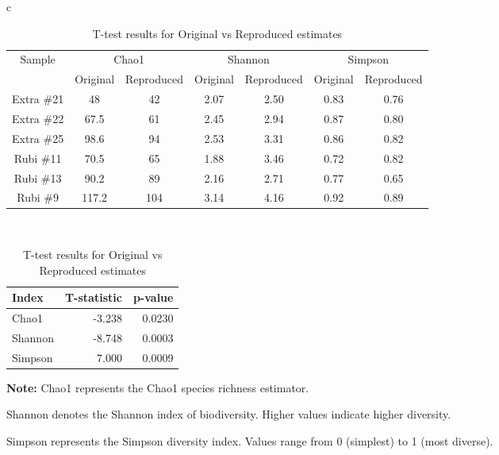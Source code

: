    
\begin{table}[H]
\centering
\begin{threeparttable}
\caption{Comparison of Original and reproduced estimates and T-test results}
\begin{tabular}{c}
\begin{subtable}{\textwidth}
\centering
\caption{Species richness and diversity of fungal communities in Extra and Rubi beer barrels}
\begin{tabular}{|c|c|c|c|c|c|c|}
\hline
\multirow{2}{*}{Sample} & \multicolumn{2}{c|}{Chao1} & \multicolumn{2}{c|}{Shannon} & \multicolumn{2}{c|}{Simpson} \\ \cline{2-7} 
                        & Original & Reproduced & Original & Reproduced & Original & Reproduced \\ \hline
Extra \#21              & 48    & 42  & 2.07    & 2.50    & 0.83    & 0.76    \\ \hline
Extra \#22              & 67.5  & 61  & 2.45    & 2.94    & 0.87    & 0.80    \\ \hline
Extra \#25              & 98.6  & 94  & 2.53    & 3.31    & 0.86    & 0.82    \\ \hline
Rubi \#11               & 70.5  & 65  & 1.88    & 3.46    & 0.72    & 0.82    \\ \hline
Rubi \#13               & 90.2  & 89  & 2.16    & 2.71    & 0.77    & 0.65    \\ \hline
Rubi \#9                & 117.2 & 104 & 3.14    & 4.16    & 0.92    & 0.89    \\ \hline
\end{tabular}
\end{subtable}
\\
\begin{subtable}{\textwidth}
\centering
\caption{T-test results for Original vs Reproduced estimates}
\begin{tabular}{|l|r|r|}
\hline
  Index &  T-statistic &  p-value \\
\hline
  Chao1 &    -3.238 & 0.0230 \\
\hline
Shannon &    -8.748 & 0.0003 \\
\hline
Simpson &     7.000 & 0.0009 \\
\hline
\end{tabular}
\end{subtable}
\end{tabular}
\begin{tablenotes}[flushleft]
\footnotesize
\item \textbf{Note:} Chao1 represents the Chao1 species richness estimator.
\item Shannon denotes the Shannon index of biodiversity. Higher values indicate higher diversity.
\item Simpson represents the Simpson diversity index. Values range from 0 (simplest) to 1 (most diverse).
\end{tablenotes}
\end{threeparttable}
\label{tab:combined_table}
\end{table}

